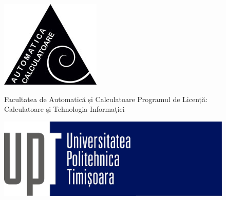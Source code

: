 \documentclass[11pt]{report}
\begin{document}
\begin{titlepage}
\begin{center}

    \begin{figure}[!htb]
        \begin{minipage}{0.14\textwidth}
            \includegraphics[width=\linewidth]{images/logo_ac.jpg}
        \end{minipage}\hfill
        \begin{minipage}{0.45\textwidth}
            Facultatea de Automatică și Calculatoare \newline
            Programul de Licență: \newline
            Calculatoare şi Tehnologia Informaţiei
        \end{minipage}\hfill
        \begin{minipage}{0.3\textwidth}
            \includegraphics[width=\linewidth]{images/logo_upt.jpg}
        \end{minipage}
    \end{figure}


\end{center}
\end{titlepage}
\end{document}
